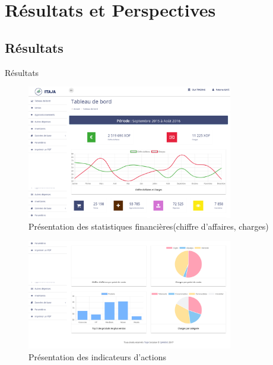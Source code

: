 \documentclass[xcolor=dvipsnames]{beamer}
\begin{document}
  \section{Résultats et Perspectives}
  \subsection{Résultats}
  \begin{frame}{Résultats}
  \begin{center}
  \begin{figure}[H]
  \includegraphics[scale=0.5, width=9cm]{images/qdashboard1.png}
  \caption{Présentation des statistiques financières(chiffre d'affaires, charges)}
  \end{figure} 
  \end{center}	
  \end{frame}
  
  \begin{frame}
  \begin{center}
  \begin{figure}[H]
  \includegraphics[scale=0.5, width=9cm]{images/qdashboard2.png}
  \caption{Présentation des indicateurs d'actions}
  \end{figure} 
  \end{center}	
  \end{frame}
  
\end{document}
